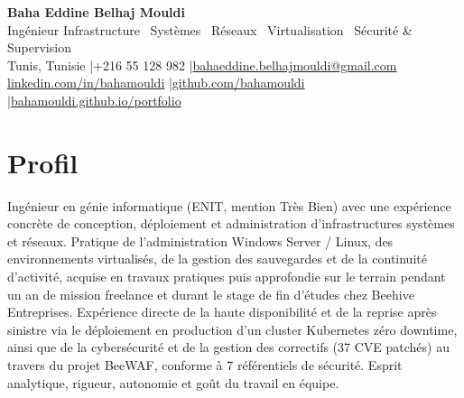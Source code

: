 \documentclass[a4paper,9pt]{article}
\begin{document}
\begin{center}
{\LARGE\bfseries\color{navy} Baha Eddine Belhaj Mouldi}\\[2pt]
{\normalsize\color{navy} Ingénieur Infrastructure \textbar\ Systèmes \textbar\ Réseaux \textbar\ Virtualisation \textbar\ Sécurité \& Supervision}\\[3pt]
{\small Tunis, Tunisie \quad|\quad +216 55 128 982 \quad|\quad \href{mailto:bahaeddine.belhajmouldi@gmail.com}{bahaeddine.belhajmouldi@gmail.com}}\\[1pt]
{\small \href{https://www.linkedin.com/in/bahamouldi}{linkedin.com/in/bahamouldi} \quad|\quad \href{https://github.com/bahamouldi}{github.com/bahamouldi} \quad|\quad \href{https://bahamouldi.github.io/portfolio/}{bahamouldi.github.io/portfolio}}
\end{center}
\vspace{1pt}
\section{Profil}
Ingénieur en génie informatique (ENIT, mention Très Bien) avec une expérience concrète de conception, déploiement et administration d'infrastructures systèmes et réseaux. Pratique de l'administration Windows Server / Linux, des environnements virtualisés, de la gestion des sauvegardes et de la continuité d'activité, acquise en travaux pratiques puis approfondie sur le terrain pendant un an de mission freelance et durant le stage de fin d'études chez Beehive Entreprises. Expérience directe de la haute disponibilité et de la reprise après sinistre via le déploiement en production d'un cluster Kubernetes zéro downtime, ainsi que de la cybersécurité et de la gestion des correctifs (37 CVE patchés) au travers du projet BeeWAF, conforme à 7 référentiels de sécurité. Esprit analytique, rigueur, autonomie et goût du travail en équipe.
\end{document}
